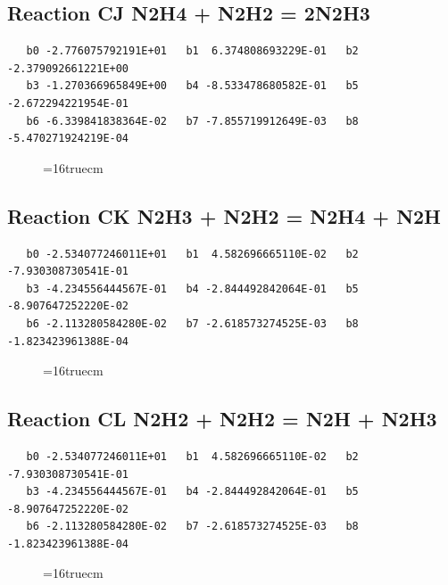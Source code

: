 \documentclass[12pt,dvipdfm]{article}
\begin{document}
\subsection{
Reaction CJ N2H4 + N2H2 = 2N2H3 }
\begin{small}\begin{verbatim}
   b0 -2.776075792191E+01   b1  6.374808693229E-01   b2 -2.379092661221E+00
   b3 -1.270366965849E+00   b4 -8.533478680582E-01   b5 -2.672294221954E-01
   b6 -6.339841838364E-02   b7 -7.855719912649E-03   b8 -5.470271924219E-04
\end{verbatim}\end{small}
\begin{figure}[h!] \label{n2rates}
\epsfxsize=16truecm
\end{figure}
\newpage

\subsection{
Reaction CK N2H3 + N2H2 = N2H4 + N2H }
\begin{small}\begin{verbatim}
   b0 -2.534077246011E+01   b1  4.582696665110E-02   b2 -7.930308730541E-01
   b3 -4.234556444567E-01   b4 -2.844492842064E-01   b5 -8.907647252220E-02
   b6 -2.113280584280E-02   b7 -2.618573274525E-03   b8 -1.823423961388E-04
\end{verbatim}\end{small}
\begin{figure}[h!] \label{n2rates}
\epsfxsize=16truecm
\end{figure}
\newpage

\subsection{
Reaction CL N2H2 + N2H2 = N2H + N2H3 }
\begin{small}\begin{verbatim}
   b0 -2.534077246011E+01   b1  4.582696665110E-02   b2 -7.930308730541E-01
   b3 -4.234556444567E-01   b4 -2.844492842064E-01   b5 -8.907647252220E-02
   b6 -2.113280584280E-02   b7 -2.618573274525E-03   b8 -1.823423961388E-04
\end{verbatim}\end{small}
\begin{figure}[h!] \label{n2rates}
\epsfxsize=16truecm
\end{figure}
\newpage
\end{document}
